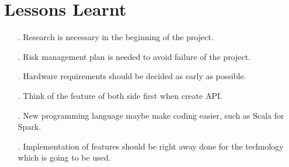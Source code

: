 \documentclass[prodmode,acmtosem]{acmsmall} %
\begin{document}
\section{Lessons Learnt}
\begin{itemize}
\item[.] Research is necessary in the beginning of the project.
\item[.] Risk management plan is needed to avoid failure of the project.
\item[.] Hardware requirements should be decided as early as possible.
\item[.] Think of the feature of both side first when create API.
\item[.] New programming language maybe make coding easier, such as Scala for Spark.
\item[.] Implementation of features should be right away done for the technology which is going to be used.
\end{itemize}
\end{document}

